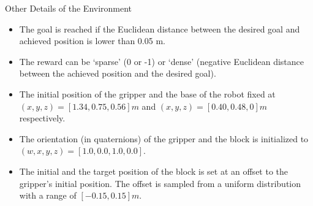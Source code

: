 \begin{frame}{Other Details of the Environment}
    \begin{itemize}
        \item The goal is reached if the Euclidean distance between the desired goal and achieved position is lower than 0.05 m.
        \item The reward can be `sparse' (0 or -1) or `dense' (negative Euclidean distance between the achieved position and the desired goal).
        \item The initial position of the gripper and the base of the robot fixed at $(x,y,z) = [1.34, 0.75, 0.56] m$ and $(x,y,z) = [0.40, 0.48, 0] m$ respectively.
        \item The orientation (in quaternions) of the gripper and the block is initialized to $(w,x,y,z) = [1.0, 0.0, 1.0, 0.0]$.
        \item The initial and the target position of the block is set at an offset to the gripper's initial position. The offset is sampled from a uniform distribution with a range of $[-0.15, 0.15] m$.
    \end{itemize}
\end{frame}
